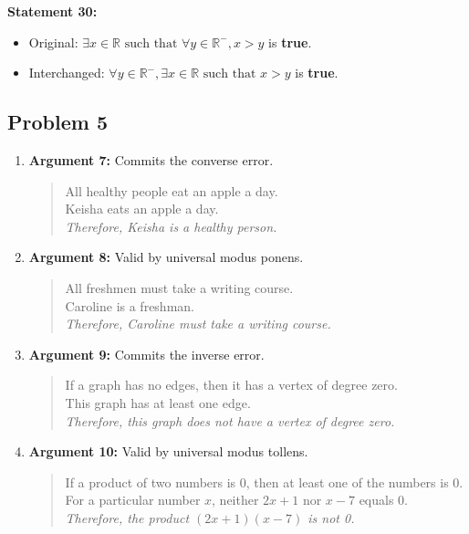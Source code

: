 \documentclass[a4paper, 10pt]{article}
\begin{document}
    \noindent \textbf{Statement 30:}
    \begin{itemize}
        \item Original: \( \exists x \in \mathbb{R} \text{ such that } \forall y \in \mathbb{R^-}, x > y \) is \textbf{true}.
        \item Interchanged: \( \forall y \in \mathbb{R^-}, \exists x \in \mathbb{R} \text{ such that } x > y \) is \textbf{true}.
    \end{itemize}

    \pagebreak
    \subsection{Problem 5}
    \begin{enumerate}
        \item \textbf{Argument 7:} Commits the converse error.
        \begin{quote}
            All healthy people eat an apple a day.\\
            Keisha eats an apple a day.\\
            \emph{Therefore, Keisha is a healthy person.}
        \end{quote}

        \item \textbf{Argument 8:} Valid by universal modus ponens.
        \begin{quote}
            All freshmen must take a writing course.\\
            Caroline is a freshman.\\
            \emph{Therefore, Caroline must take a writing course.}
        \end{quote}

        \item \textbf{Argument 9:} Commits the inverse error.
        \begin{quote}
            If a graph has no edges, then it has a vertex of degree zero.\\
            This graph has at least one edge.\\
            \emph{Therefore, this graph does not have a vertex of degree zero.}
        \end{quote}

        \item \textbf{Argument 10:} Valid by universal modus tollens.
        \begin{quote}
            If a product of two numbers is 0, then at least one of the numbers is 0.\\
            For a particular number \(x\), neither \(2x + 1\) nor \(x - 7\) equals 0.\\
            \emph{Therefore, the product \((2x + 1)(x - 7)\) is not 0.}
        \end{quote}
    \end{enumerate}
\end{document}
